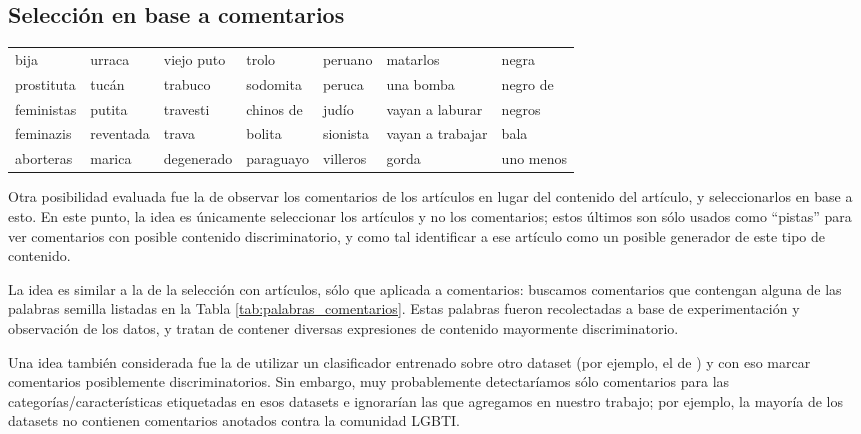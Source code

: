 \subsection{Selección en base a comentarios}
\label{subsec:seleccion_comentarios}


\begin{table*}[t!]
    \centering
    \begin{tabular}{l|l|l|l|l|l|l}
    bija          & urraca     & viejo puto    & trolo      & peruano  & matarlos         & negra      \\
    prostituta    & tucán      & trabuco       & sodomita   & peruca   & una bomba        & negro de   \\
    feministas    & putita     & travesti      & chinos de  & judío    & vayan a laburar  & negros     \\
    feminazis     & reventada  & trava         & bolita     & sionista & vayan a trabajar & bala       \\
    aborteras     & marica     & degenerado    & paraguayo  & villeros & gorda            & uno menos  \\
    \end{tabular}
    \caption{Palabras utilizadas para recolectar comentarios}
    \label{tab:palabras_comentarios}
\end{table*}

Otra posibilidad evaluada fue la de observar los comentarios de los artículos en lugar del contenido del artículo, y seleccionarlos en base a esto. En este punto, la idea es únicamente seleccionar los artículos y no los comentarios; estos últimos son sólo usados como ``pistas'' para ver comentarios con posible contenido discriminatorio, y como tal identificar a ese artículo como un posible generador de este tipo de contenido.

La idea es similar a la de la selección con artículos, sólo que aplicada a comentarios: buscamos comentarios que contengan alguna de las palabras semilla listadas en la Tabla \ref{tab:palabras_comentarios}. Estas palabras fueron recolectadas a base de experimentación y observación de los datos, y tratan de contener diversas expresiones de contenido mayormente discriminatorio.

Una idea también considerada fue la de utilizar un clasificador entrenado sobre otro dataset (por ejemplo, el de \citet{hateval2019semeval}) y con eso marcar comentarios posiblemente discriminatorios. Sin embargo, muy probablemente detectaríamos sólo comentarios para las categorías/características etiquetadas en esos datasets e ignorarían las que agregamos en nuestro trabajo; por ejemplo, la mayoría de los datasets no contienen comentarios anotados contra la comunidad LGBTI.

